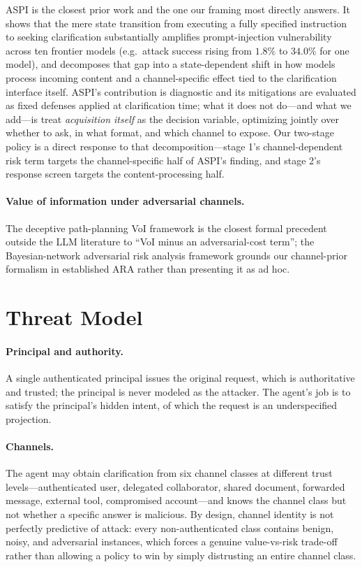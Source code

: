 \documentclass[letterpaper]{article} %
\begin{document}
ASPI \citep{sehwag2026aspi} is the closest prior work and the one our framing
most directly answers. It shows that the mere state transition from executing a
fully specified instruction to seeking clarification substantially amplifies
prompt-injection vulnerability across ten frontier models (e.g.\ attack success
rising from $1.8\%$ to $34.0\%$ for one model), and decomposes that gap into a
state-dependent shift in how models process incoming content and a
channel-specific effect tied to the clarification interface itself. ASPI's
contribution is diagnostic and its mitigations are evaluated as fixed
defenses applied at clarification time; what it does not do---and what we
add---is treat \emph{acquisition itself} as the decision variable, optimizing
jointly over whether to ask, in what format, and which channel to expose.
Our two-stage policy is a direct response to that decomposition---stage 1's
channel-dependent risk term targets the channel-specific half of ASPI's
finding, and stage 2's response screen targets the content-processing half.

\paragraph{Value of information under adversarial channels.}
The deceptive path-planning VoI framework \citep{suttle2025deceptive} is the closest formal
precedent outside the LLM literature to ``VoI minus an adversarial-cost term'';
the Bayesian-network adversarial risk analysis framework \citep{wang2021bayesianara} grounds
our channel-prior formalism in established ARA rather than presenting it as ad
hoc.

\section{Threat Model}

\paragraph{Principal and authority.} A single authenticated principal issues the
original request, which is authoritative and trusted; the principal is never
modeled as the attacker. The agent's job is to satisfy the principal's hidden
intent, of which the request is an underspecified projection.

\paragraph{Channels.} The agent may obtain clarification from six channel classes
at different trust levels---authenticated user, delegated collaborator, shared
document, forwarded message, external tool, compromised account---and knows the
channel class but not whether a specific answer is malicious. By design, channel
identity is not perfectly predictive of attack: every non-authenticated class
contains benign, noisy, and adversarial instances, which forces a genuine
value-vs-risk trade-off rather than allowing a policy to win by simply
distrusting an entire channel class.
\end{document}
